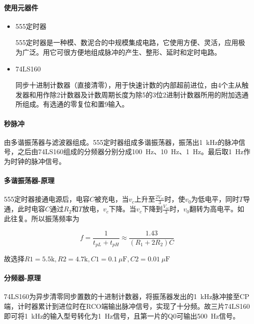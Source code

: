 \documentclass[lang=cn, 11pt, a4paper, cite=authornum, ctexfont]{paper}
\begin{document}
\paragraph{使用元器件}
\begin{itemize}
	\item 555定时器

		555定时器是一种模、数泥合的中规模集成电路，它使用方便、灵活，应用极为广泛。用它可很方便地组成脉冲的产生、整形、延时和定时电路。
	\item 74LS160

		同步十进制计数器（直接清零），用于快速计数的内部超前进位，由4个主从触发器和用作除2计数器及计数周期长度为除5的3位2进制计数器所用的附加选通所组成。有选通的零复位和置9输入。
\end{itemize}

\paragraph{秒脉冲}由多谐振荡器与滤波器组成。555定时器组成多谐振荡器，振荡出\SI{1}{\kilo\hertz}的脉冲信号，之后由74LS160组成的分频器分别分成\SI{100}{\hertz}、\SI{10}{\hertz}、\SI{1}{\hertz}。最后取\SI{1}{\hertz}作为时钟的脉冲信号。

\paragraph{多谐振荡器-原理}

555定时器接通电源后，电容$C$被充电，当$v_c$上升至$\frac{2 V_{cc}}{3}$时，使$v_0$为低电平，同时$T$导通，此时电容$C$通过$R_2$和$T$放电，$v_c$下降。当$v_c$下降到$\frac{V_{cc}}{3}$时，$v_0$翻转为高电平。如此往复。所以振荡频率为

$$f = \frac{1}{t_{pL} + t_{pH}} \approx \frac{1.43}{(R_1 + 2R_2)C}$$

故选择$R1 = 5.5\si{\kilo}, R2 = 4.7\si{\kilo}, C1 = \SI{0.1}{\mu\farad}, C2=\SI{0.01}{\mu\farad}$

\paragraph{分频器-原理}

74LS160为异步清零同步置数的十进制计数器，将振荡器发出的\SI{1}{\kilo\hertz}脉冲接至CP端，计时器累计到进位时在RCO端输出脉冲信号，实现了十分频。故三片74LS160即可将\SI{1}{\kilo\hertz}的输入型号转化为\SI{1}{\hertz}信号，且第一片的Q0可输出\SI{500}{\hertz}信号。
\end{document}

